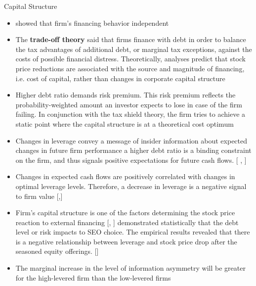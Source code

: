 \documentclass{beamer}
\begin{document}
\begin{frame}{Capital Structure}
	\begin{itemize}
		\tiny 
		\item \cite{modigliani1958cost} showed that firm’s financing behavior independent
		\item The \textbf{trade-off theory} said that
		firms finance with debt in order to balance the tax advantages of additional debt, or
		marginal tax exceptions, against the costs of possible financial distress. Theoretically, analyses predict that stock price reductions are associated with the source and magnitude
		of financing, i.e. cost of capital, rather than changes in corporate capital structure
		\item Higher debt ratio  demands  risk premium. This risk premium reflects the probability-weighted amount an investor expects to lose in case of the firm failing. In conjunction with the tax shield theory, the firm tries to achieve a static point where the capital structure is at a theoretical cost optimum
		\item Changes in leverage convey a message of insider information about expected changes in future firm performance a higher debt ratio is a binding
		constraint on the firm, and thus signals positive expectations for future cash flows. [\cite{ross1977determination} , \cite{downes1982signaling}] 
		\item  Changes in expected cash flows are positively correlated with changes in optimal leverage levels. Therefore, a decrease in leverage is a negative
		signal to firm value [\cite{deangelo1980optimal},\cite{modigliani1963corporate}]
		\item  Firm’s
		capital structure is one of the factors determining the stock price reaction to external
		financing
		 [\cite{dierkens1991information},
		\cite{raymar1993financing}] 
		\cite{cronqvist2005choice}  demonstrated
		statistically that the debt level or risk impacts to SEO choice. The empirical results revealed that there is a negative relationship between leverage and stock price drop after the seasoned equity offerings. [\cite{quyhn2009leverage}]
		\item The marginal increase
		in the level of information asymmetry will be greater for the high-levered firm than the
		low-levered firms 
	\end{itemize}
\end{frame}
\end{document}

